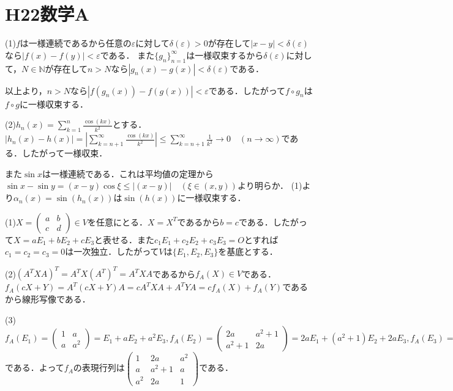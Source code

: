 \documentclass[
		book,
		head_space=20mm,
		foot_space=20mm,
		gutter=10mm,
		line_length=190mm
]{jlreq}
\begin{document}
\section{H22数学A}
(1)$f$は一様連続であるから任意の$\varepsilon$に対して$\delta(\varepsilon)>0$が存在して$|x-y|<\delta(\varepsilon)$なら$|f(x)-f(y)|<\varepsilon$である．
また$\{g_n\}_{n=1}^\infty$は一様収束するから$\delta(\varepsilon)$に対して，$N\in \mathbb{N}$が存在して$n>N$なら$|g_n(x)-g(x)|<\delta(\varepsilon)$である．

以上より，$n>N$なら$|f(g_n(x))-f(g(x))|<\varepsilon$である．したがって$f\circ g_n$は$f\circ g$に一様収束する．

(2)$h_n(x)=\sum\limits_{k=1}^n\frac{\cos (kx)}{k^2}$とする．
$|h_n(x)-h(x)|=\left|\sum\limits_{k=n+1}^\infty\frac{\cos (kx)}{k^2}\right|\le \sum\limits_{k=n+1}^\infty\frac{1}{k^2}\rightarrow0\quad (n \to \infty)$である．したがって一様収束．

また$\sin x$は一様連続である．これは平均値の定理から$\sin x-\sin y=(x-y)\cos \xi\le |(x-y)|\quad(\xi \in (x,y))$より明らか．
(1)より$\alpha_n(x)=\sin(h_n(x))$は$\sin(h(x))$に一様収束する．

(1)$X=\begin{pmatrix}
    a & b \\
    c & d
\end{pmatrix} \in V$を任意にとる．$X=X^T$であるから$b=c$である．したがって$X=aE_1+bE_2+cE_3$と表せる．また$c_1E_1+c_2E_2+c_3E_3=O$とすれば$c_1=c_2=c_3=0$は一次独立．したがって$V$は$\{E_1,E_2,E_3\}$を基底とする．

(2)$(A^TXA)^T=A^TX(A^T)^T=A^TXA$であるから$f_A(X)\in V$である．
$f_A(cX+Y)=A^T(cX+Y)A=cA^TXA+A^TYA=cf_A(X)+f_A(Y)$であるから線形写像である．

(3)$f_A(E_1)=\begin{pmatrix} 
    1 & a \\
    a & a^2
    \end{pmatrix}=E_1+aE_2+a^2E_3,
    f_A(E_2)=\begin{pmatrix}
    2a & a^2+1 \\
    a^2+1 & 2a 
    \end{pmatrix}=2aE_1+(a^2+1)E_2+2aE_3,
    f_A(E_3)=\begin{pmatrix}
    a^2 & a \\
    a & 1
    \end{pmatrix}=a^2E_1+aE_2+E_3$である．よって$f_A$の表現行列は$\begin{pmatrix}
    1 & 2a & a^2 \\
    a & a^2+1 & a \\
    a^2 & 2a & 1
    \end{pmatrix}$である．
\end{document}
